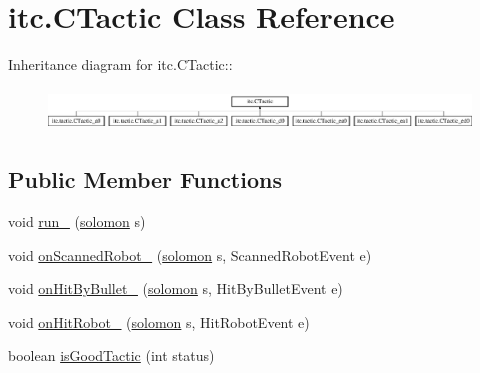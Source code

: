 \hypertarget{classitc_1_1_c_tactic}{
\section{itc.CTactic Class Reference}
\label{classitc_1_1_c_tactic}
}
Inheritance diagram for itc.CTactic::\begin{figure}[H]
\begin{center}
\leavevmode
\includegraphics[height=1.12676cm]{classitc_1_1_c_tactic}
\end{center}
\end{figure}
\subsection*{Public Member Functions}
\begin{DoxyCompactItemize}
\item 
void \hyperlink{classitc_1_1_c_tactic_ae5f5c51a6e04d22bc298dbdec4080770}{run\_\-} (\hyperlink{classitc_1_1solomon}{solomon} s)
\item 
void \hyperlink{classitc_1_1_c_tactic_a63a5a64ff30293061e37eca71fb77a96}{onScannedRobot\_\-} (\hyperlink{classitc_1_1solomon}{solomon} s, ScannedRobotEvent e)
\item 
void \hyperlink{classitc_1_1_c_tactic_a9a8d125f826667459758f2767c3bd957}{onHitByBullet\_\-} (\hyperlink{classitc_1_1solomon}{solomon} s, HitByBulletEvent e)
\item 
void \hyperlink{classitc_1_1_c_tactic_a19cf73207948eff2c6db7d90fce8bd55}{onHitRobot\_\-} (\hyperlink{classitc_1_1solomon}{solomon} s, HitRobotEvent e)
\item 
boolean \hyperlink{classitc_1_1_c_tactic_aefcf5f13687e17eaa8bf5dd4be3b424b}{isGoodTactic} (int status)
\end{DoxyCompactItemize}
